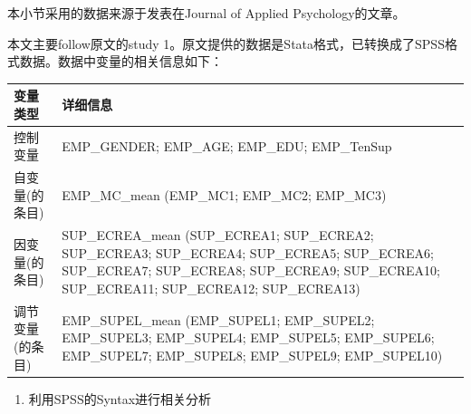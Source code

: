\documentclass[
]{book}
\providecommand{\tightlist}{%
  \setlength{\itemsep}{0pt}\setlength{\parskip}{0pt}}
\begin{document}
本小节采用的数据来源于发表在Journal of Applied Psychology的文章\autocite{Liu2020:RNG}。

本文主要follow原文的study 1。原文提供的数据是Stata格式，已转换成了SPSS格式数据。数据中变量的相关信息如下：

\begin{longtable}[]{@{}ll@{}}
\toprule
\begin{minipage}[b]{0.35\columnwidth}\raggedright
变量类型\strut
\end{minipage} & \begin{minipage}[b]{0.59\columnwidth}\raggedright
详细信息\strut
\end{minipage}\tabularnewline
\midrule
\endhead
\begin{minipage}[t]{0.35\columnwidth}\raggedright
控制变量\strut
\end{minipage} & \begin{minipage}[t]{0.59\columnwidth}\raggedright
EMP\_GENDER; EMP\_AGE; EMP\_EDU; EMP\_TenSup\strut
\end{minipage}\tabularnewline
\begin{minipage}[t]{0.35\columnwidth}\raggedright
自变量(的条目)\strut
\end{minipage} & \begin{minipage}[t]{0.59\columnwidth}\raggedright
EMP\_MC\_mean (EMP\_MC1; EMP\_MC2; EMP\_MC3)\strut
\end{minipage}\tabularnewline
\begin{minipage}[t]{0.35\columnwidth}\raggedright
因变量(的条目)\strut
\end{minipage} & \begin{minipage}[t]{0.59\columnwidth}\raggedright
SUP\_ECREA\_mean (SUP\_ECREA1; SUP\_ECREA2; SUP\_ECREA3; SUP\_ECREA4; SUP\_ECREA5; SUP\_ECREA6; SUP\_ECREA7; SUP\_ECREA8; SUP\_ECREA9; SUP\_ECREA10; SUP\_ECREA11; SUP\_ECREA12; SUP\_ECREA13)\strut
\end{minipage}\tabularnewline
\begin{minipage}[t]{0.35\columnwidth}\raggedright
调节变量(的条目)\strut
\end{minipage} & \begin{minipage}[t]{0.59\columnwidth}\raggedright
EMP\_SUPEL\_mean (EMP\_SUPEL1; EMP\_SUPEL2; EMP\_SUPEL3; EMP\_SUPEL4; EMP\_SUPEL5; EMP\_SUPEL6; EMP\_SUPEL7; EMP\_SUPEL8; EMP\_SUPEL9; EMP\_SUPEL10)\strut
\end{minipage}\tabularnewline
\bottomrule
\end{longtable}

\begin{enumerate}
\def\labelenumi{\arabic{enumi}.}
\tightlist
\item
  利用SPSS的Syntax进行相关分析
\end{enumerate}
\end{document}
